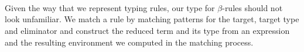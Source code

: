 {\begin{code}
\AgdaSymbol{(}\AgdaSymbol{;}\AgdaSpace{}%
\AgdaOperator{\AgdaInductiveConstructor{\AgdaUnderscore{},\AgdaUnderscore{}}}\AgdaSymbol{;}\AgdaSpace{}%
\AgdaSymbol{)}\<%
\\
\>[0]\AgdaSpace{}%
\AgdaSpace{}%
\AgdaSpace{}%
\AgdaSpace{}%
\AgdaSymbol{(}\AgdaSymbol{;}\AgdaSpace{}%
\AgdaInductiveConstructor{[]}\AgdaSymbol{;}\AgdaSpace{}%
\AgdaSymbol{)}\<%
\\
\>[0]\AgdaSpace{}%
\AgdaSpace{}%
\AgdaSpace{}%
\AgdaSpace{}%
\AgdaSymbol{(}\AgdaSymbol{;}\AgdaSpace{}%
\AgdaSymbol{;}\AgdaSpace{}%
\AgdaSymbol{)}\<%
\\
\>[0]\AgdaSpace{}%
\AgdaSpace{}%
\AgdaSpace{}%
\AgdaSpace{}%
\AgdaSymbol{(}\AgdaSymbol{;}\AgdaSpace{}%
\AgdaSymbol{;}\AgdaSpace{}%
\AgdaSymbol{)}\<%
\end{code}
}


Given the way that we represent typing rules, our type for $β$-rules
should not look unfamiliar. We match a rule by matching patterns for the
target, target type and eliminator and construct the reduced term
and its type from an expression and the resulting environment we
computed in the matching process.

